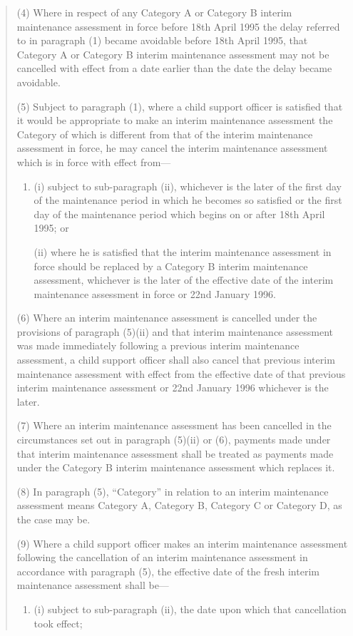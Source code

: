 \documentclass[a4paper]{article}
\begin{document}
\begin{quotation}
(4) Where in respect of any Category A or Category B interim maintenance assessment in force before 18th April 1995 the delay referred to in paragraph (1) became avoidable before 18th April 1995, that Category A or Category B interim maintenance assessment may not be cancelled with effect from a date earlier than the date the delay became avoidable.

(5) Subject to paragraph (1), where a child support officer is satisfied that it would be appropriate to make an interim maintenance assessment the Category of which is different from that of the interim maintenance assessment in force, he may cancel the interim maintenance assessment which is in force with effect from—
\begin{enumerate}\item[]
(i) subject to sub-paragraph (ii), whichever is the later of the first day of the maintenance period in which he becomes so satisfied or the first day of the maintenance period which begins on or after 18th April 1995; or

(ii) where he is satisfied that the interim maintenance assessment in force should be replaced by a Category B interim maintenance assessment, whichever is the later of the effective date of the interim maintenance assessment in force or 22nd January 1996.
\end{enumerate}

(6) Where an interim maintenance assessment is cancelled under the provisions of paragraph (5)(ii) and that interim maintenance assessment was made immediately following a previous interim maintenance assessment, a child support officer shall also cancel that previous interim maintenance assessment with effect from the effective date of that previous interim maintenance assessment or 22nd January 1996 whichever is the later.

(7) Where an interim maintenance assessment has been cancelled in the circumstances set out in paragraph (5)(ii) or (6), payments made under that interim maintenance assessment shall be treated as payments made under the Category B interim maintenance assessment which replaces it.

(8) In paragraph (5), “Category” in relation to an interim maintenance assessment means Category A, Category B, Category C or Category D, as the case may be.

(9) Where a child support officer makes an interim maintenance assessment following the cancellation of an interim maintenance assessment in accordance with paragraph (5), the effective date of the fresh interim maintenance assessment shall be—
\begin{enumerate}\item[]
(i) subject to sub-paragraph (ii), the date upon which that cancellation took effect;


\end{enumerate}
\end{quotation}
\end{document}
